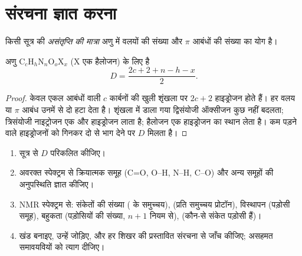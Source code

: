 \section{संरचना ज्ञात करना}

\begin{definition}[असंतृप्ति की मात्रा]\label{def:b1:structure-spectroscopy:unsaturation}
किसी सूत्र की \emph{असंतृप्ति की मात्रा}
अणु में वलयों की संख्या और $\pi$ आबंधों की संख्या का
योग है।
\end{definition}

\begin{proposition}[सूत्र से असंतृप्ति की मात्रा]\label{prop:b1:structure-spectroscopy:unsaturation-formula}
अणु $\mathrm{C}_c\mathrm{H}_h\mathrm{N}_n\mathrm{O}_o\mathrm{X}_x$
(X एक हैलोजन) के लिए  है
\[
  D = \frac{2c + 2 + n - h - x}{2} .
\]
\end{proposition}

\begin{proof}
केवल एकल आबंधों वाली $c$ कार्बनों की खुली शृंखला पर $2c + 2$
हाइड्रोजन होते हैं। हर वलय या $\pi$ आबंध उनमें से दो हटा देता है। शृंखला में
डाला गया द्विसंयोजी ऑक्सीजन कुछ नहीं बदलता; त्रिसंयोजी नाइट्रोजन एक और
हाइड्रोजन लाता है; हैलोजन एक हाइड्रोजन का स्थान लेता है। कम पड़ने वाले
हाइड्रोजनों को गिनकर दो से भाग देने पर $D$ मिलता है।
\end{proof}

\begin{method}\label{met:b1:structure-spectroscopy:solve-structure}
\begin{enumerate}
  \item सूत्र से $D$ परिकलित कीजिए।
  \item अवरक्त स्पेक्ट्रम से क्रियात्मक समूह (C=O, O--H, N--H,
        C--O) और अन्य समूहों की अनुपस्थिति ज्ञात कीजिए।
  \item NMR स्पेक्ट्रम से: संकेतों की संख्या ( के
        समुच्चय),  (प्रति समुच्चय प्रोटॉन), विस्थापन (पड़ोसी
        समूह), बहुकता (पड़ोसियों की संख्या, $n + 1$
        नियम से),  (कौन-से संकेत पड़ोसी हैं)।
  \item खंड बनाइए, उन्हें जोड़िए, और हर शिखर की प्रस्तावित संरचना से
        जाँच कीजिए; असहमत समावयवियों को त्याग दीजिए।
\end{enumerate}
\end{method}

